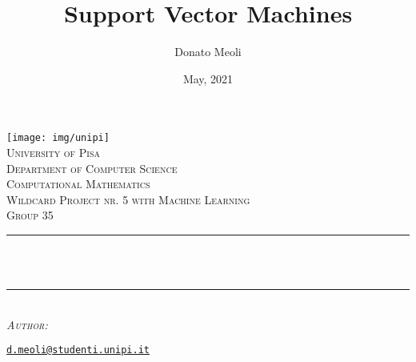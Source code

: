 \documentclass[10pt]{article}
\title{Support Vector Machines}
\author{Donato Meoli}
\date{May, 2021}
\makeatletter
\theoremstyle{plain}
\theoremstyle{definition}
\let\thetitle\@title
\let\theauthor\@author
\let\thedate\@date
\makeatother
\begin{document}
\begin{titlepage}
	\centering
    \vspace*{0.5 cm}
    \texttt{[image: img/unipi]}\\[1.0 cm]
    \textsc{\LARGE University of Pisa}\\[0.5 cm]
    \textsc{\Large Department of Computer Science}\\[1.5 cm]
	\textsc{\large Computational Mathematics \\ Wildcard Project nr. 5 with Machine Learning \\ Group 35}\\[0.5 cm]
	\rule{\linewidth}{0.2 mm} \\[0.4 cm]
	{ \huge \bfseries \thetitle}\\
	\rule{\linewidth}{0.2 mm} \\[1.5 cm]
	\centering \textsc{\large \emph{Author:}}\\[0.5 cm]
	\begin{minipage}{0.4\textwidth}
		\begin{center} \large
			\textbf{\theauthor}
			\texttt{\href{mailto::d.meoli@studenti.unipi.it}{d.meoli@studenti.unipi.it}}
		\end{center}
		\end{minipage}~
		\begin{minipage}{0.4\textwidth}
	\end{minipage}\\[2 cm]
	{\large \thedate}\\[2 cm]
	\vfill
\end{titlepage}

\tableofcontents

\pagebreak

\listoffigures

\pagebreak

\listoftables

\pagebreak

\listofalgorithms
{}

\pagebreak

\listoftheorems

\pagebreak




\pagebreak



\pagebreak



\pagebreak



\pagebreak



\pagebreak



\pagebreak



\pagebreak



\end{document}
